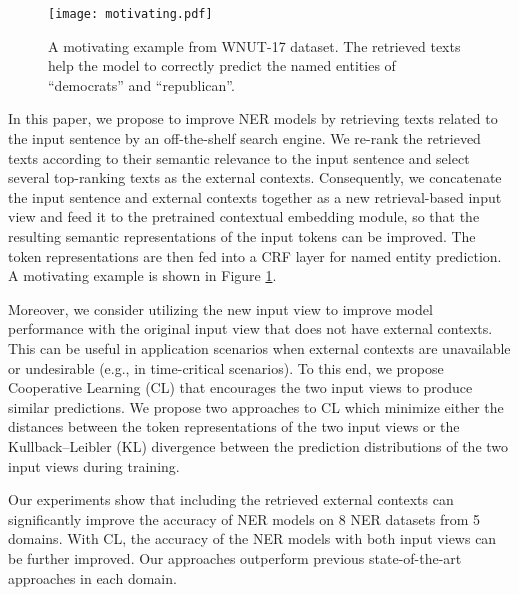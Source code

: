 \documentclass[11pt,a4paper]{article}
\begin{document}
\begin{figure}[t]
	\centering
	\texttt{[image: motivating.pdf]}
	\caption{A motivating example from WNUT-17 dataset. The retrieved texts help the model to correctly predict the named entities of ``democrats'' and ``republican''.}
	\label{fig:motivate}
\end{figure}

In this paper, we propose to improve NER models by retrieving texts related to the input sentence by an off-the-shelf search engine. We re-rank the retrieved texts according to their semantic relevance to the input sentence and select several top-ranking texts as the external contexts. Consequently, we concatenate the input sentence and external contexts together as a new retrieval-based input view and feed it to the pretrained contextual embedding module, so that the resulting semantic representations of the input tokens can be improved. The token representations are then fed into a CRF layer for named entity prediction. A motivating example is shown in Figure \ref{fig:motivate}.

Moreover, we consider utilizing the new input view to improve model performance with the original input view that does not have external contexts. This can be useful in application scenarios when external contexts are unavailable or undesirable (e.g., in time-critical scenarios). To this end, we propose Cooperative Learning (CL) that encourages the two input views to produce similar predictions. We propose two approaches to CL which minimize either the  distances between the token representations of the two input views or the Kullback–Leibler (KL) divergence between the prediction distributions of the two input views during training. 

Our experiments show that including the retrieved external contexts can significantly improve the accuracy of NER models on 8 NER datasets from 5 domains. With CL, the accuracy of the NER models with both input views can be further improved. Our approaches outperform previous state-of-the-art approaches in each domain. 
\end{document}
